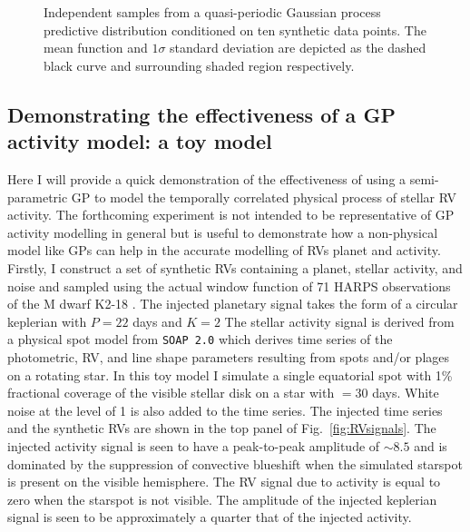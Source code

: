 \begin{figure}
  \centering
  \caption[Samples from a quasi-periodic Gaussian process predictive distribution.]
          {Independent samples from a quasi-periodic Gaussian process predictive distribution
            conditioned on ten synthetic data points. The mean function and
            $1\sigma$ standard deviation are depicted as the dashed black curve and surrounding
          shaded region respectively.}
  \label{fig:gpsamplespred}
\end{figure}


\subsection{Demonstrating the effectiveness of a GP activity model: a toy model}
Here I will provide a quick demonstration of the effectiveness of using a semi-parametric GP
to model the temporally correlated physical process of stellar RV activity. The forthcoming
experiment is not intended to be representative of GP activity modelling in general but is
useful to demonstrate how a non-physical model  like GPs can help in the accurate modelling
of RVs planet and activity. \\

Firstly, I construct
a set of synthetic RVs containing a planet, stellar activity, and noise and sampled using the
actual window function of 71 HARPS observations of the M dwarf K2-18 \citep{cloutier17b}.
The injected planetary
signal takes the form of a circular keplerian with $P=22$ days and $K=2$  The stellar
activity signal is derived from a physical spot model from \texttt{SOAP 2.0} \citep{dumusque14}
which derives time series of the photometric, RV, and line shape parameters resulting from
spots and/or plages on a rotating star. In this toy model I simulate a single equatorial spot
with 1\% fractional coverage of the visible stellar disk on a star with \prot{}$=30$ days.
White noise at the level of 1 \mps{} is also added to the time series.
The injected time series and the synthetic RVs are shown in the top panel of
Fig.~\ref{fig:RVsignals}. The injected activity signal is seen to have a peak-to-peak amplitude of
$\sim 8.5$ \mps{} and is dominated by the suppression of convective blueshift when the simulated
starspot is present on the visible hemisphere. The RV signal due to activity is equal to zero when
the starspot is not visible. The amplitude of the injected keplerian signal is seen to be
approximately a quarter that of the injected activity. \\

